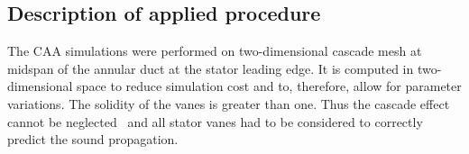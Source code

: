 

\subsection{Description of applied procedure}

The CAA simulations were performed on two-dimensional cascade mesh at midspan of the annular duct at the stator leading edge. It is computed in two-dimensional space to reduce simulation cost and to, therefore, allow for parameter variations. 
The solidity of the vanes is greater than one. Thus the cascade effect cannot be neglected~\cite{blandeau_comparison_2011} and all stator vanes had to be considered to correctly predict the sound propagation.  

